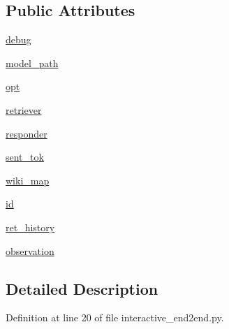 \subsection*{Public Attributes}
\begin{DoxyCompactItemize}
\item 
\hyperlink{classinteractive__end2end_1_1interactive__end2end_1_1InteractiveEnd2endAgent_a369a09c90ef1bddde4432f2e41befb59}{debug}
\item 
\hyperlink{classinteractive__end2end_1_1interactive__end2end_1_1InteractiveEnd2endAgent_a3a5c31f0a1b49bd3e848d2270f3e24bc}{model\+\_\+path}
\item 
\hyperlink{classinteractive__end2end_1_1interactive__end2end_1_1InteractiveEnd2endAgent_a85ea739abdd803414abe3e131c0965dd}{opt}
\item 
\hyperlink{classinteractive__end2end_1_1interactive__end2end_1_1InteractiveEnd2endAgent_aaabc8b5dd597ab35435b91263a30644a}{retriever}
\item 
\hyperlink{classinteractive__end2end_1_1interactive__end2end_1_1InteractiveEnd2endAgent_a1a5b8baf2e7ce61420fde25f643e3597}{responder}
\item 
\hyperlink{classinteractive__end2end_1_1interactive__end2end_1_1InteractiveEnd2endAgent_a7ab06ed68f1fcdb8543487f090a1c00c}{sent\+\_\+tok}
\item 
\hyperlink{classinteractive__end2end_1_1interactive__end2end_1_1InteractiveEnd2endAgent_a4d34c25f00a82a908fa45507996f1824}{wiki\+\_\+map}
\item 
\hyperlink{classinteractive__end2end_1_1interactive__end2end_1_1InteractiveEnd2endAgent_ad61f3600033911177ac81f3cea446cc2}{id}
\item 
\hyperlink{classinteractive__end2end_1_1interactive__end2end_1_1InteractiveEnd2endAgent_a6fc3ebbeca880fd8d1706dc2b483fc16}{ret\+\_\+history}
\item 
\hyperlink{classinteractive__end2end_1_1interactive__end2end_1_1InteractiveEnd2endAgent_a9c69a4218e497d150aa9ffb07cf57e21}{observation}
\end{DoxyCompactItemize}


\subsection{Detailed Description}


Definition at line 20 of file interactive\+\_\+end2end.\+py.



